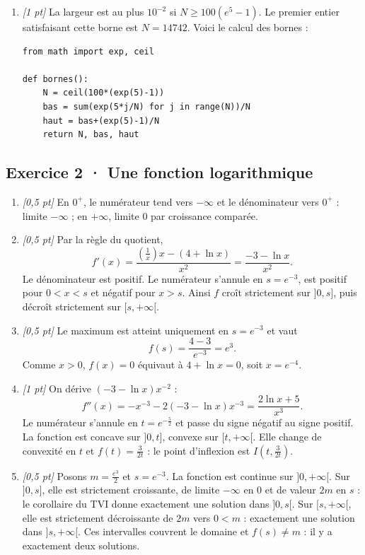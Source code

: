 \begin{enumerate}

\item \textit{[1 pt]} La largeur est au plus $10^{-2}$ si $N\ge100(e^{5}-1)$. Le premier entier satisfaisant cette borne est $N=14742$. Voici le calcul des bornes :
\begin{lstlisting}
from math import exp, ceil

def bornes():
    N = ceil(100*(exp(5)-1))
    bas = sum(exp(5*j/N) for j in range(N))/N
    haut = bas+(exp(5)-1)/N
    return N, bas, haut
\end{lstlisting}


\end{enumerate}

\subsection*{Exercice 2 · Une fonction logarithmique}\begin{enumerate}

\item \textit{[0{,}5 pt]} En $0^+$, le numérateur tend vers $-\infty$ et le dénominateur vers $0^+$ : limite $-\infty$ ; en $+\infty$, limite $0$ par croissance comparée.

\item \textit{[0{,}5 pt]} Par la règle du quotient,
\[f'(x)=\frac{(\frac{1}{x})x-(4+\ln x)}{x^2}=\frac{-3-\ln x}{x^2}.\]
Le dénominateur est positif. Le numérateur s'annule en $s=e^{-3}$, est positif pour $0<x<s$ et négatif pour $x>s$. Ainsi $f$ croît strictement sur $]0,s]$, puis décroît strictement sur $[s,+\infty[$.

\item \textit{[0{,}5 pt]} Le maximum est atteint uniquement en $s=e^{-3}$ et vaut
\[f(s)=\frac{4- 3}{e^{-3}}=e^{3}.\]
Comme $x>0$, $f(x)=0$ équivaut à $4+\ln x=0$, soit $x=e^{-4}$.

\item \textit{[1 pt]} On dérive $(-3-\ln x)x^{-2}$ :
\[f''(x)=-x^{-3}-2(-3-\ln x)x^{-3}=\frac{2\ln x+5}{x^3}.\]
Le numérateur s'annule en $t=e^{-\frac{5}{2}}$ et passe du signe négatif au signe positif. La fonction est concave sur $]0,t]$, convexe sur $[t,+\infty[$. Elle change de convexité en $t$ et $f(t)=\frac{3}{2t}$ : le point d'inflexion est $I(t,\frac{3}{2t})$.

\item \textit{[0{,}5 pt]} Posons $m=\frac{e^{3}}{2}$ et $s=e^{-3}$. La fonction est continue sur $]0,+\infty[$. Sur $]0,s]$, elle est strictement croissante, de limite $-\infty$ en $0$ et de valeur $2m$ en $s$ : le corollaire du TVI donne exactement une solution dans $]0,s[$. Sur $[s,+\infty[$, elle est strictement décroissante de $2m$ vers $0<m$ : exactement une solution dans $]s,+\infty[$. Ces intervalles couvrent le domaine et $f(s)\ne m$ : il y a exactement deux solutions.


\end{enumerate}
